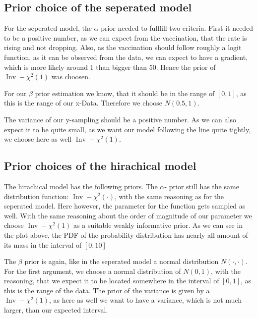 \documentclass[
]{article}
\begin{document}
\hypertarget{prior-choice-of-the-seperated-model}{%
\subsection{Prior choice of the seperated
model}\label{prior-choice-of-the-seperated-model}}

For the seperated model, the \(\alpha\) prior needed to fullfill two
criteria. First it needed to be a positive number, as we can expect from
the vaccination, that the rate is rising and not dropping. Also, as the
vaccination should follow roughly a logit function, as it can be
observed from the data, we can expect to have a gradient, which is more
likely around \(1\) than bigger than \(50\). Hence the prior of
\(\operatorname{Inv}-\chi^{2}(1)\) was choosen.

For our \(\beta\) prior estimation we know, that it should be in the
range of \([0,1]\), as this is the range of our x-Data. Therefore we
choose \(N(0.5,1)\).

The variance of our y-sampling should be a positive number. As we can
also expect it to be quite small, as we want our model following the
line quite tightly, we choose here as well
\(\operatorname{Inv}-\chi^{2}(1)\).

\hypertarget{prior-choices-of-the-hirachical-model}{%
\subsection{Prior choices of the hirachical
model}\label{prior-choices-of-the-hirachical-model}}

The hirachical model has the following priors. The \(\alpha\)- prior
still has the same distribution function:
\(\operatorname{Inv}-\chi^{2}(\cdot)\), with the same reasoning as for
the seperated model. Here however, the parameter for the function gets
sampled as well. With the same reasoning about the order of magnitude of
our parameter we choose \(\operatorname{Inv}-\chi^{2}(1)\) as a suitable
weakly informative prior. As we can see in the plot above, the PDF of
the probability distribution has nearly all amount of its mass in the
interval of \([0,10]\)

The \(\beta\) prior is again, like in the seperated model a normal
distribution \(N(\cdot,\cdot)\). For the first argument, we choose a
normal distribution of \(N(0,1)\), with the reasoning, that we expect it
to be located somewhere in the interval of \([0,1]\), as this is the
range of the data. The prior of the variance is given by a
\(\operatorname{Inv}-\chi^{2}(1)\), as here as well we want to have a
variance, which is not much larger, than our expected interval.
\end{document}
